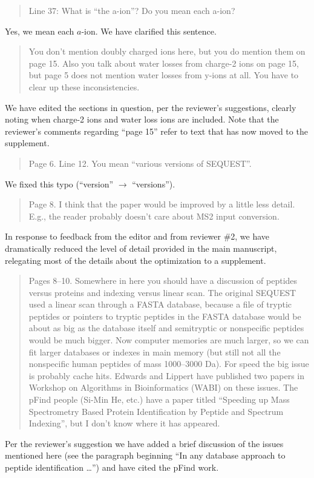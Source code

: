 \documentclass{article}
\newcommand{\breview}{\begin{quotation}\begin{em}\noindent}
\newcommand{\ereview}{\end{em}\end{quotation}}
\begin{document}
\breview Line 37: What is ``the a-ion''? Do you mean each a-ion?
\ereview

Yes, we mean each $a$-ion.  We have clarified this sentence.

\breview You don't mention doubly charged ions here, but you do
mention them on page 15. Also you talk about water losses from
charge-2 ions on page 15, but page 5 does not mention water losses
from y-ions at all. You have to clear up these inconsistencies.
\ereview

We have edited the sections in question, per the reviewer's
suggestions, clearly noting when charge-2 ions and water loss ions are
included. Note that the reviewer's comments regarding ``page 15''
refer to text that has now moved to the supplement.

\breview Page 6. Line 12. You mean ``various versions of
SEQUEST''. \ereview

We fixed this typo (``version'' $\rightarrow$ ``versions'').

\breview
Page 8. I think that the paper would be improved by a little less
detail. E.g., the reader probably doesn't care about MS2 input
conversion. \ereview

In response to feedback from the editor and from reviewer \#2, we have
dramatically reduced the level of detail provided in the main
manuscript, relegating most of the details about the optimization
to a supplement.

\breview Pages 8--10. Somewhere in here you should have a discussion of
peptides versus proteins and indexing versus linear scan. The original
SEQUEST used a linear scan through a FASTA database, because a file of
tryptic peptides or pointers to tryptic peptides in the FASTA database
would be about as big as the database itself and semitryptic or
nonspecific peptides would be much bigger. Now computer memories are
much larger, so we can fit larger databases or indexes in main memory
(but still not all the nonspecific human peptides of mass 1000–3000
Da). For speed the big issue is probably cache hits. Edwards and
Lippert have published two papers in Workshop on Algorithms in
Bioinformatics (WABI) on these issues. The pFind people (Si-Min He,
etc.) have a paper titled ``Speeding up Mass Spectrometry Based Protein
Identification by Peptide and Spectrum Indexing'', but I don't know
where it has appeared. \ereview

Per the reviewer's suggestion we have added a brief discussion of the
issues mentioned here (see the paragraph beginning ``In any database
approach to peptide identification \dots'') and have cited the pFind
work.
\end{document}
